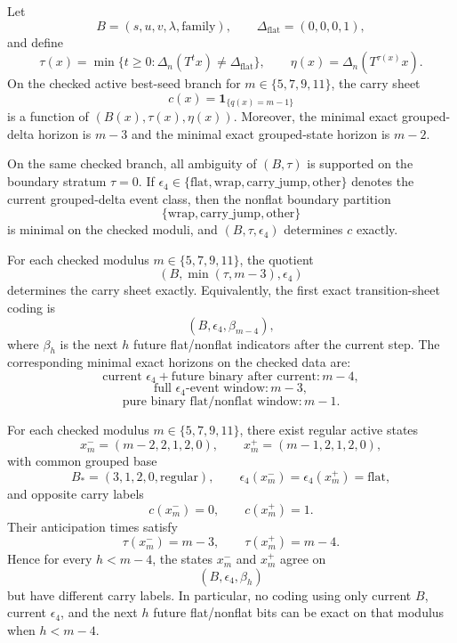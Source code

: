 
\begin{proposition}
Let
\[
B=(s,u,v,\lambda,\mathrm{family}),
\qquad
\Delta_{\mathrm{flat}}=(0,0,0,1),
\]
and define
\[
\tau(x)=\min\{t\ge 0 : \Delta_n(T^t x)\ne \Delta_{\mathrm{flat}}\},
\qquad
\eta(x)=\Delta_n(T^{\tau(x)}x).
\]
On the checked active best-seed branch for $m\in\{5,7,9,11\}$, the carry sheet
\[
c(x)=\mathbf 1_{\{q(x)=m-1\}}
\]
is a function of $(B(x),\tau(x),\eta(x))$.
Moreover, the minimal exact grouped-delta horizon is $m-3$ and the minimal exact grouped-state horizon is $m-2$.
\end{proposition}

\begin{proposition}
On the same checked branch, all ambiguity of $(B,\tau)$ is supported on the boundary stratum $\tau=0$.
If $\epsilon_4\in\{\mathrm{flat},\mathrm{wrap},\mathrm{carry\_jump},\mathrm{other}\}$ denotes the current grouped-delta event class, then the nonflat boundary partition
\[
\{\mathrm{wrap},\mathrm{carry\_jump},\mathrm{other}\}
\]
is minimal on the checked moduli, and $(B,\tau,\epsilon_4)$ determines $c$ exactly.
\end{proposition}

\begin{proposition}
For each checked modulus $m\in\{5,7,9,11\}$, the quotient
\[
(B,\min(\tau,m-3),\epsilon_4)
\]
determines the carry sheet exactly.
Equivalently, the first exact transition-sheet coding is
\[
(B,\epsilon_4,\beta_{m-4}),
\]
where $\beta_h$ is the next $h$ future flat/nonflat indicators after the current step.
The corresponding minimal exact horizons on the checked data are:
\[
\text{current }\epsilon_4 + \text{future binary after current}: m-4,
\]
\[
\text{full }\epsilon_4\text{-event window}: m-3,
\]
\[
\text{pure binary flat/nonflat window}: m-1.
\]
\end{proposition}

\begin{proposition}
For each checked modulus $m\in\{5,7,9,11\}$, there exist regular active states
\[
x^-_m=(m-2,2,1,2,0),
\qquad
x^+_m=(m-1,2,1,2,0),
\]
with common grouped base
\[
B_*=(3,1,2,0,\mathrm{regular}),
\qquad
\epsilon_4(x^-_m)=\epsilon_4(x^+_m)=\mathrm{flat},
\]
and opposite carry labels
\[
c(x^-_m)=0,
\qquad
c(x^+_m)=1.
\]
Their anticipation times satisfy
\[
\tau(x^-_m)=m-3,
\qquad
\tau(x^+_m)=m-4.
\]
Hence for every $h<m-4$, the states $x^-_m$ and $x^+_m$ agree on
\[
(B,\epsilon_4,\beta_h)
\]
but have different carry labels. In particular, no coding using only current $B$, current $\epsilon_4$, and the next $h$ future flat/nonflat bits can be exact on that modulus when $h<m-4$.
\end{proposition}

